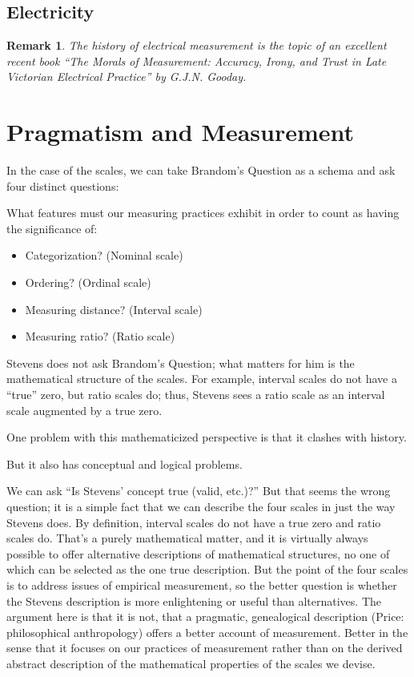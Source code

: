 \documentclass[11pt,twoside]{article}
\newtheorem{remark}{Remark}
\begin{document}
\subsection{Electricity}

\begin{remark}
  The history of electrical measurement is the topic of an excellent
  recent book ``The Morals of Measurement: Accuracy, Irony, and Trust
  in Late Victorian Electrical Practice'' by G.J.N. Gooday.
\end{remark}

\clearpage
\section{Pragmatism and Measurement}

In the case of the scales, we can take Brandom's Question as a schema
and ask four distinct questions:

What features must our measuring practices exhibit in order to count
as having the significance of:

\begin{itemize}
\item Categorization? (Nominal scale)
\item Ordering?  (Ordinal scale)
\item Measuring distance? (Interval scale)
\item Measuring ratio? (Ratio scale)
\end{itemize}

Stevens does not ask Brandom's Question; what matters for him is the
mathematical structure of the scales.  For example, interval scales do
not have a ``true'' zero, but ratio scales do; thus, Stevens sees
a ratio scale as an interval scale augmented by a true zero.

One problem with this mathematicized perspective is that it clashes
with history.

But it also has conceptual and logical problems.

We can ask ``Is Stevens' concept true (valid, etc.)?''  But that seems
the wrong question; it is a simple fact that we can describe the four
scales in just the way Stevens does.  By definition, interval scales
do not have a true zero and ratio scales do.  That's a purely
mathematical matter, and it is virtually always possible to offer
alternative descriptions of mathematical structures, no one of which
can be selected as the one true description.  But the point of the
four scales is to address issues of empirical measurement, so the
better question is whether the Stevens description is more
enlightening or useful than alternatives.  The argument here is that
it is not, that a pragmatic, genealogical description (Price:
philosophical anthropology) offers a better account of measurement.
Better in the sense that it focuses on our practices of measurement
rather than on the derived abstract description of the mathematical
properties of the scales we devise.
\end{document}

